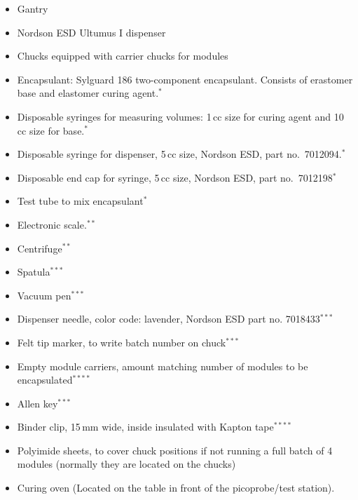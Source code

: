 \documentclass[12pt]{unlsilabsop}
\begin{document}
\begin{itemize}
    \item Gantry
    \item Nordson ESD Ultumus I dispenser
    \item Chucks equipped with carrier chucks for modules
    \item Encapsulant: Sylguard 186 two-component encapsulant. Consists of erastomer base and elastomer curing agent.$^*$
    \item Disposable syringes for measuring volumes: 1\,cc size for curing agent and 10\,cc size for base.$^*$ 
    \item Disposable syringe for dispenser, 5\,cc size, Nordson ESD, part no.~7012094.$^*$
    \item Disposable end cap for syringe, 5\,cc size, Nordson ESD, part no.~7012198$^*$
    \item Test tube to mix encapsulant$^*$
    \item Electronic scale.$^{**}$
    \item Centrifuge$^{**}$
    \item Spatula$^{***}$
    \item Vacuum pen$^{***}$
    \item Dispenser needle, color code: lavender, Nordson ESD part no. 7018433$^{***}$
    \item Felt tip marker, to write batch number on chuck$^{***}$
    \item Empty module carriers, amount matching number of modules to be encapsulated$^{****}$ 
    \item Allen key$^{***}$
    \item Binder clip, 15\,mm wide, inside insulated with Kapton tape$^{****}$ 
    \item Polyimide sheets, to cover chuck positions if not running a full batch of 4 modules (normally they are located on the chucks)
    \item Curing oven (Located  on the table in front of the picoprobe/test station).
\end{itemize}
\end{document}
